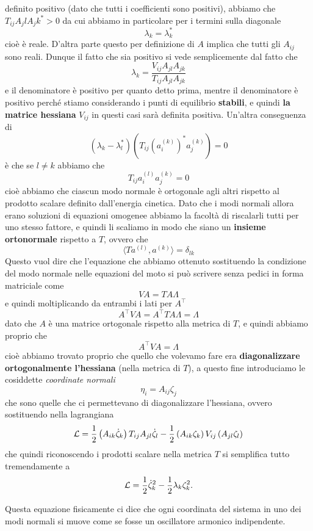 \documentclass[11pt]{scrartcl}
\begin{document}
	definito positivo (dato che tutti i coefficienti sono positivi), abbiamo che $T_{ij}A_jlA_jk^*>0$ da cui abbiamo in particolare per i termini sulla diagonale
	$$\lambda_k=\lambda_k^*$$
	cioè è reale. D'altra parte questo per definizione di $A$ implica che tutti gli $A_{ij}$ sono reali. Dunque il fatto che sia positivo si vede semplicemente dal fatto che
	$$\lambda_k=\frac{V_{ij}A_{jl}A_{jk}}{T_{ij}A_{jl}A_{jk}}$$
	e il denominatore è positivo per quanto detto prima, mentre il denominatore è positivo perché stiamo considerando i punti di equilibrio \textbf{stabili}, e quindi \textbf{la matrice hessiana} $V_{ij}$ in questi casi sarà definita positiva. Un'altra conseguenza di
	$$\left(\lambda_k-\lambda_l^*\right)\left(T_{ij}\left(a_i^{(k)}\right)^*a_j^{(k)}\right)=0$$
	è che se $l\ne k$ abbiamo che 
	$$T_{ij}a_i^{(l)}a_j^{(k)}=0$$
	cioè abbiamo che ciascun modo normale è ortogonale agli altri rispetto al prodotto scalare definito dall'energia cinetica. Dato che i modi normali allora erano soluzioni di equazioni omogenee abbiamo la facoltà di riscalarli tutti per uno stesso fattore, e quindi li scaliamo in modo che siano un \textbf{insieme ortonormale} rispetto a $T$, ovvero che
	$$\langle Ta^{(l)},a^{(k)}\rangle=\delta_{lk}$$
	Questo vuol dire che l'equazione che abbiamo ottenuto sostituendo la condizione del modo normale nelle equazioni del moto si può scrivere senza pedici in forma matriciale come
	$$VA=TA\Lambda$$
	e quindi moltiplicando da entrambi i lati per $A^\intercal$
	$$A^\intercal VA=A^\intercal TA\Lambda=\Lambda$$
	dato che $A$ è una matrice ortogonale rispetto alla metrica di $T$, e quindi abbiamo proprio che 
	$$A^\intercal VA=\Lambda$$
	cioè abbiamo trovato proprio che quello che volevamo fare era \textbf{diagonalizzare ortogonalmente l'hessiana} (nella metrica di $T$), a questo fine introduciamo le cosiddette \textit{coordinate normali}
	$$\eta_i=A_{ij}\zeta_j$$ 
	che sono quelle che ci permettevano di diagonalizzare l'hessiana, ovvero sostituendo nella lagrangiana
	$$\mathcal{L}=\frac{1}{2} \left(A_{ik}\dot{\zeta}_k\right)T_{ij}A_{jl}\dot{\zeta}_l-\frac{1}{2} \left(A_{ik}\zeta_k\right)V_{ij}\left(A_{jl}\zeta_l\right)$$
	che quindi riconoscendo i prodotti scalare nella metrica $T$ si semplifica tutto tremendamente a 
	$$\mathcal{L}=\frac{1}{2} \dot{\zeta}_k^2-\frac{1}{2} \lambda_k \zeta_k^2.$$
	\begin{remark}
		Questa equazione fisicamente ci dice che ogni coordinata del sistema in uno dei modi normali si muove come se fosse un oscillatore armonico indipendente.
	\end{remark}
	
\end{document}
